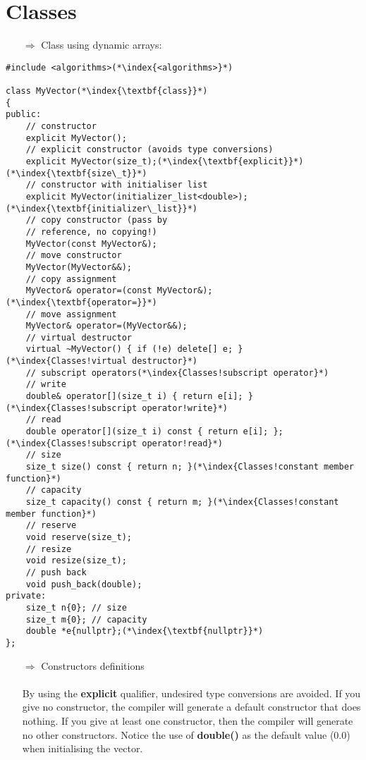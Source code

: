 \documentclass[10pt]{article}
\begin{document}
\section{Classes}
\small
\begin{enumerate}
\item[$\Rightarrow$] Class using dynamic arrays:
\end{enumerate}
\begin{lstlisting}
#include <algorithms>(*\index{<algorithms>}*)

class MyVector(*\index{\textbf{class}}*)
{
public:
    // constructor
    explicit MyVector();
    // explicit constructor (avoids type conversions)
    explicit MyVector(size_t);(*\index{\textbf{explicit}}*)(*\index{\textbf{size\_t}}*)
    // constructor with initialiser list
    explicit MyVector(initializer_list<double>);(*\index{\textbf{initializer\_list}}*)
    // copy constructor (pass by
    // reference, no copying!)
    MyVector(const MyVector&);
    // move constructor
    MyVector(MyVector&&);
    // copy assignment
    MyVector& operator=(const MyVector&);(*\index{\textbf{operator=}}*)
    // move assignment
    MyVector& operator=(MyVector&&);
    // virtual destructor
    virtual ~MyVector() { if (!e) delete[] e; }(*\index{Classes!virtual destructor}*)
    // subscript operators(*\index{Classes!subscript operator}*)
    // write
    double& operator[](size_t i) { return e[i]; }(*\index{Classes!subscript operator!write}*)
    // read
    double operator[](size_t i) const { return e[i]; };(*\index{Classes!subscript operator!read}*)
    // size
    size_t size() const { return n; }(*\index{Classes!constant member function}*)
    // capacity
    size_t capacity() const { return m; }(*\index{Classes!constant member function}*)
    // reserve
    void reserve(size_t);
    // resize
    void resize(size_t);
    // push back
    void push_back(double);
private:
    size_t n{0}; // size
    size_t m{0}; // capacity
    double *e{nullptr};(*\index{\textbf{nullptr}}*)
};
\end{lstlisting}
\begin{enumerate}
\item[$\Rightarrow$] Constructors definitions\\ \\ By using the \textbf{explicit} qualifier, undesired type conversions are avoided. If you give no constructor, the compiler will generate a default constructor that does nothing.
If you give at least one constructor, then the compiler will generate no other constructors. Notice the use of \textbf{double()} as the default value (0.0)
when initialising the vector.
\end{enumerate}
\end{document}
